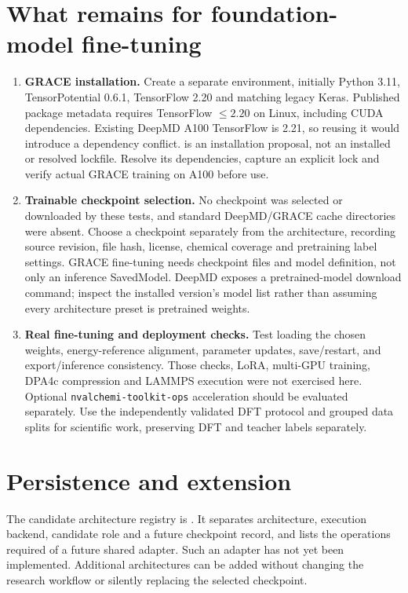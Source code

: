 \documentclass[10pt,a4paper]{article}
\begin{document}
\section{What remains for foundation-model fine-tuning}
\begin{enumerate}
\item \textbf{GRACE installation.} Create a separate environment, initially
Python 3.11, TensorPotential 0.6.1, TensorFlow 2.20 and matching legacy Keras.
Published package metadata requires TensorFlow $\leq2.20$ on Linux,
including CUDA dependencies. Existing DeepMD A100 TensorFlow is 2.21, so
reusing it would introduce a dependency conflict.
 is an installation proposal,
not an installed or resolved lockfile. Resolve its dependencies, capture
an explicit lock and verify actual GRACE training on A100 before use.

\item \textbf{Trainable checkpoint selection.} No checkpoint was selected
or downloaded by these tests, and standard DeepMD/GRACE cache directories
were absent. Choose a checkpoint separately from the architecture, recording
source revision, file hash, license, chemical coverage and pretraining label
settings. GRACE fine-tuning needs checkpoint files and model definition,
not only an inference SavedModel. DeepMD exposes a pretrained-model
download command; inspect the installed version's model list rather than
assuming every architecture preset is pretrained weights.

\item \textbf{Real fine-tuning and deployment checks.} Test loading the
chosen weights, energy-reference alignment, parameter updates, save/restart,
and export/inference consistency. Those checks, LoRA, multi-GPU training,
DPA4c compression and LAMMPS execution were not exercised here. Optional
\texttt{nvalchemi-toolkit-ops} acceleration should be evaluated separately.
Use the independently validated DFT protocol and grouped data splits for
scientific work, preserving DFT and teacher labels separately.
\end{enumerate}

\section{Persistence and extension}
The candidate architecture registry is .
It separates architecture, execution backend, candidate role and a future
checkpoint record, and lists the operations required of a future shared
adapter. Such an adapter has not yet been implemented. Additional architectures
can be added without changing the research workflow or silently replacing
the selected checkpoint.
\end{document}
